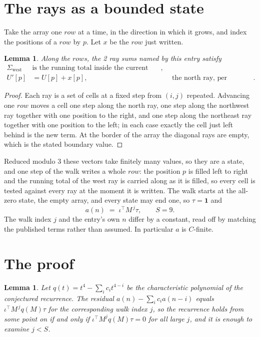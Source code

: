 \documentclass[11pt,a4paper]{article}
\theoremstyle{plain}
\newtheorem{lemma}[theorem]{Lemma}
\theoremstyle{definition}
\begin{document}
\section{The rays as a bounded state}

Take the array one $row$ at a time, in the direction in which it grows, and index the
positions of a $row $ by $p$. Let $x$ be the $row$ just written.

\begin{lemma}\label{lem:rays}
Along the $row$s, the 2 ray sums named by this entry satisfy
\[
\begin{aligned}
\Sigma_{\mathrm{west}}\ &\text{is the running total inside the current row},\\
U'[p]&=U[p]+x[p], &&\text{the north ray, per position} .
\end{aligned}
\]
\end{lemma}

\begin{proof}
Each ray is a set of cells at a fixed step from $(i,j)$ repeated. Advancing one $row$
moves a cell one step along the north ray, one step along the northwest ray together with one
position to the right, and one step along the northeast ray together with one position to the
left; in each case exactly the cell just left behind is the new term. At the border of the
array the diagonal rays are empty, which is the stated boundary value.
\end{proof}

Reduced modulo $3$ these vectors take finitely many values, so they are a state, and one step
of the walk writes a whole $row$: the position $p$ is filled left to right and the
running total of the west ray is carried along as it is filled, so every cell is tested
against every ray at the moment it is written. The walk starts at the all-zero state, the empty
array, and every state may end one, so $\tau=\mathbf{1}$ and
\[
a(n)\;=\;\iota^{\!\top}M^{\,j}\tau ,\qquad S=9.
\]
The walk index $j$ and the entry's own $n$ differ by a constant, read off by matching the
published terms rather than assumed. In particular $a$ is $C$-finite.

\section{The proof}

\begin{lemma}\label{lem:crit}
Let $q(t)=t^{4}-\sum_i c_it^{4-i}$ be the characteristic polynomial of the
conjectured recurrence. The residual $a(n)-\sum_ic_ia(n-i)$ equals
$\iota^{\!\top}M^{\,j}q(M)\tau$ for the corresponding walk index $j$, so the recurrence
holds from some point on if and only if $\iota^{\!\top}M^{j}q(M)\tau=0$ for all large $j$,
and it is enough to examine $j<S$.
\end{lemma}
\end{document}
